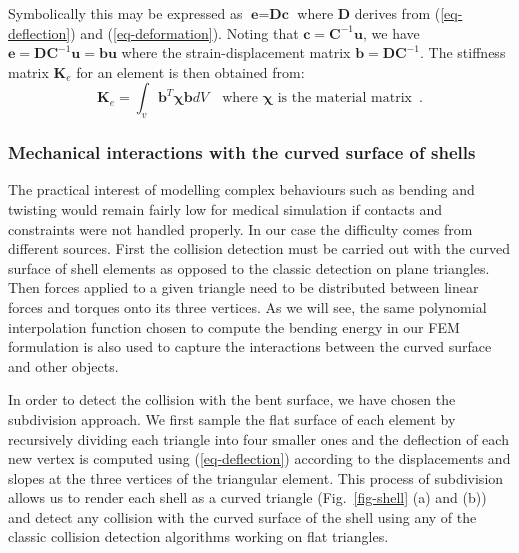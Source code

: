 \documentclass{llncs}
\begin{document}
Symbolically this may be expressed as $\textbf{e} = \textbf{Dc}$ where $\textbf{D}$ derives from (\ref{eq-deflection}) and (\ref{eq-deformation}). Noting that $\textbf{c} = \textbf{C}^{-1}\textbf{u}$, we have $\textbf{e} = \textbf{DC}^{-1}\textbf{u} = \textbf{bu}$ where the strain-displacement matrix $\textbf{b} = \textbf{DC}^{-1}$. 
The stiffness matrix $\textbf{K}_e$ for an element is then obtained from:
\begin{equation}
\textbf{K}_e = \int_v \textbf{b}^{T} \boldsymbol\chi \textbf{b} dV \quad
\mbox{where } \boldsymbol\chi \mbox{ is the material matrix} \enspace .
\end{equation} 

\subsubsection{Mechanical interactions with the curved surface of shells}
\label{sec:interactions}
The practical interest of modelling complex behaviours such as bending and twisting would remain fairly low for medical simulation if contacts and constraints were not handled properly. In our case the difficulty comes from different sources. First the collision detection must be carried out with the curved surface of shell elements as opposed to the classic detection on plane triangles. Then forces applied to a given triangle need to be distributed between linear forces and torques onto its three vertices. As we will see, the same polynomial interpolation function chosen to compute the bending energy in our FEM formulation is also used to capture the interactions between the curved surface and other objects. 

In order to detect the collision with the bent surface, we have chosen the subdivision approach. 
We first sample the flat surface of each element by recursively dividing each triangle into four smaller ones and the deflection of each new vertex is computed using (\ref{eq-deflection}) according to the displacements and slopes at the three vertices of the triangular element. This process of subdivision allows us to render each shell as a curved triangle (Fig.~\ref{fig-shell} (a) and (b)) and detect any collision with the curved surface of the shell using any of the classic collision detection algorithms working on flat triangles.
\end{document}
